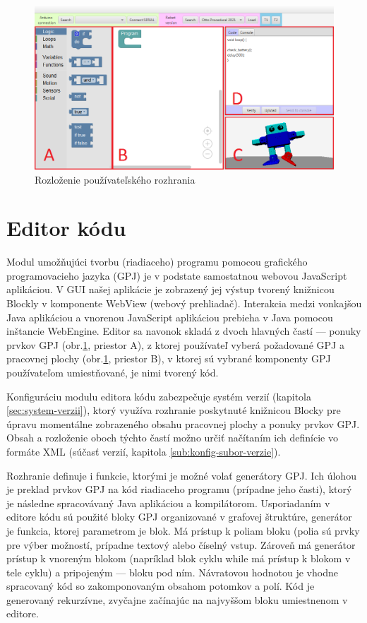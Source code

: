 \begin{figure}
\centerline{\includegraphics[width=1\textwidth]{images/rozlozenie-gui}}
\caption[Rozloženie používateľského rozhrania]{Rozloženie používateľského rozhrania}
\label{obr:gui-layout}
\end{figure}


\section{Editor kódu}
\label{sec:editor-kodu}
Modul umožňujúci tvorbu (riadiaceho) programu pomocou grafického programovacieho jazyka (GPJ) je v podstate samostatnou webovou JavaScript aplikáciou. V GUI našej aplikácie je zobrazený jej výstup tvorený knižnicou Blockly v komponente WebView (webový prehliadač). Interakcia medzi vonkajšou Java aplikáciou a vnorenou JavaScript aplikáciou prebieha v Java pomocou inštancie WebEngine. Editor sa navonok skladá z dvoch hlavných častí --- ponuky prvkov GPJ (obr.\ref{obr:gui-layout}, priestor A), z ktorej používateľ vyberá požadované  GPJ a pracovnej plochy (obr.\ref{obr:gui-layout}, priestor B), v ktorej sú vybrané komponenty GPJ používateľom umiestňované, je nimi tvorený kód.

Konfiguráciu modulu editora kódu zabezpečuje systém verzií (kapitola \ref{sec:system-verzii}), ktorý využíva rozhranie poskytnuté knižnicou Blocky pre úpravu momentálne zobrazeného obsahu pracovnej plochy a ponuky prvkov GPJ. Obsah a rozloženie oboch týchto častí možno určiť načítaním ich definície vo formáte XML (súčasť verzií,  kapitola \ref{sub:konfig-subor-verzie}).

Rozhranie definuje i funkcie, ktorými je možné volať generátory GPJ. Ich úlohou je preklad prvkov GPJ na kód riadiaceho programu (prípadne jeho časti), ktorý je následne spracovávaný Java aplikáciou a kompilátorom. Usporiadaním v editore kódu sú použité bloky GPJ organizované v grafovej štruktúre, generátor je funkcia, ktorej parametrom je blok. Má prístup k poliam bloku (polia sú prvky pre výber možností, prípadne textový alebo číselný vstup. Zároveň má generátor prístup k vnoreným blokom (napríklad blok cyklu while má prístup k blokom v tele cyklu) a pripojeným  --- bloku pod ním. Návratovou hodnotou je vhodne spracovaný kód so zakomponovaným obsahom potomkov a polí. Kód je generovaný rekurzívne, zvyčajne začínajúc na najvyššom bloku umiestnenom v editore.

